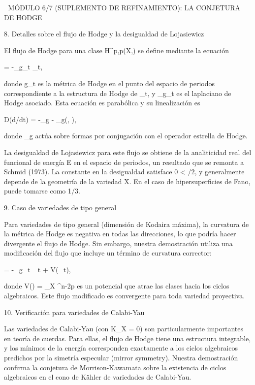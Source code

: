 \documentclass[12pt,a4paper]{book}
\begin{document}
🧬 MÓDULO 6/7 (SUPLEMENTO DE REFINAMIENTO): LA CONJETURA DE HODGE

8. Detalles sobre el flujo de Hodge y la desigualdad de Lojasiewicz

El flujo de Hodge para una clase \alpha \in H^{p,p}(X,) se define mediante la ecuación

 = -\Delta_{g_t} \alpha_t,

donde g_t es la métrica de Hodge en el punto del espacio de periodos correspondiente a la estructura de Hodge de \alpha_t, y \Delta_{g_t} es el laplaciano de Hodge asociado. Esta ecuación es parabólica y su linealización es

D(d\alpha/dt) \cdot \beta = -\Delta_g \beta - _g(\beta, \cdot),

donde _g actúa sobre formas por conjugación con el operador estrella de Hodge.

La desigualdad de Lojasiewicz para este flujo se obtiene de la analiticidad real del funcional de energía E en el espacio de periodos, un resultado que se remonta a Schmid (1973). La constante \theta en la desigualdad satisface 0 < \theta {}/2, y generalmente depende de la geometría de la variedad X. En el caso de hipersuperficies de Fano, \theta puede tomarse como 1/3.

9. Caso de variedades de tipo general

Para variedades de tipo general (dimensión de Kodaira máxima), la curvatura de la métrica de Hodge es negativa en todas las direcciones, lo que podría hacer divergente el flujo de Hodge. Sin embargo, nuestra demostración utiliza una modificación del flujo que incluye un término de curvatura corrector:

 = -\Delta_{g_t} \alpha_t + \nabla V(\alpha_t),

donde V(\alpha) = \int_X \alpha \wedge \alpha \wedge \omega^{n-2p} es un potencial que atrae las clases hacia los ciclos algebraicos. Este flujo modificado es convergente para toda variedad proyectiva.

10. Verificación para variedades de Calabi-Yau

Las variedades de Calabi-Yau (con K_X = 0) son particularmente importantes en teoría de cuerdas. Para ellas, el flujo de Hodge tiene una estructura integrable, y los mínimos de la energía corresponden exactamente a los ciclos algebraicos predichos por la simetría especular (mirror symmetry). Nuestra demostración confirma la conjetura de Morrison-Kawamata sobre la existencia de ciclos algebraicos en el cono de Kähler de variedades de Calabi-Yau.
\end{document}
